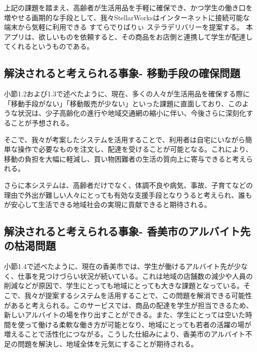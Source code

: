上記の課題を踏まえ、高齢者が生活用品を手軽に確保でき、かつ学生の働き口を増やせる画期的な手段として、我々StellarWorksはインターネットに接続可能な端末から気軽に利用できる すてらでりばりぃ ステラデリバリーを提案する。
本アプリは、欲しいものを依頼すると、その商品をお店側と連携して学生が配達してくれるというものである。

\subsection{解決されると考えられる事象- 移動手段の確保問題}

小節1.2および1.3で述べたように、現在、多くの人々が生活用品を確保する際に「移動手段がない」「移動販売が少ない」といった課題に直面しており、このような状況は、少子高齢化の進行や地域交通網の縮小に伴い、今後さらに深刻化することが予想される。

そこで、我々が考案したシステムを活用することで、利用者は自宅にいながら簡単な操作で必要なものを注文し、配達を受けることが可能となる。これにより、移動の負担を大幅に軽減し、買い物困難者の生活の質向上に寄与できると考えられる。

さらに本システムは、高齢者だけでなく、体調不良や病気、事故、子育てなどの理由で外出が難しい人々にとっても有効な支援手段となりうると考えられ、誰もが安心して生活できる地域社会の実現に貢献できると期待される。





\subsection{解決されると考えられる事象- 香美市のアルバイト先の枯渇問題}
小節1.4で述べたように、現在の香美市では、学生が働けるアルバイト先が少なく、仕事を見つけづらい状況が続いている。これは地域の店舗数の減少や人員の削減などが原因で、学生にとっても地域にとっても大きな課題となっている。そこで、我々が提案するシステムを活用することで、この問題を解消できる可能性があると考えられる。このサービスでは、商品の配達を学生が担当できるため、新しいアルバイトの場を作り出すことができる。また、学生にとっては空いた時間を使って働ける柔軟な働き方が可能となり、地域にとっても若者の活躍の場が増えることで活性化につながる。こうした仕組みにより、香美市のアルバイト不足の問題を解決し、地域全体を元気にすることが期待される。



